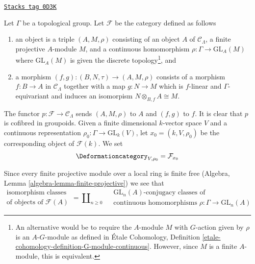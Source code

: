 \begin{example}

\label{examples-defos-example-continuous-representations}
\href{https://stacks.math.columbia.edu/tag/0D3K}{\texttt{Stacks tag 0D3K}}

Let $\Gamma$ be a topological group.
Let $\mathcal{F}$ be the category defined as follows
\begin{enumerate}
\item an object is a triple $(A, M, \rho)$ consisting of an
object $A$ of $\mathcal{C}_\Lambda$, a finite projective $A$-module $M$,
and a continuous homomorphism $\rho : \Gamma \to \text{GL}_A(M)$
where $\text{GL}_A(M)$ is given the discrete topology\footnote{An alternative
would be to require the $A$-module $M$ with $G$-action given by $\rho$
is an $A\text{-}G$-module as defined in \'Etale Cohomology, Definition
\ref{etale-cohomology-definition-G-module-continuous}. However,
since $M$ is a finite $A$-module, this is equivalent.}, and
\item a morphism $(f, g) : (B, N, \tau) \to (A, M, \rho)$ consists of
a morphism $f : B \to A$ in $\mathcal{C}_\Lambda$ together
with a map $g : N \to M$ which is $f$-linear and $\Gamma$-equivariant
and induces an isomorpism $N \otimes_{B, f} A \cong M$.
\end{enumerate}
The functor $p : \mathcal{F} \to \mathcal{C}_\Lambda$ sends $(A, M, \rho)$
to $A$ and $(f, g)$ to $f$. It is clear that $p$ is cofibred in groupoids.
Given a finite dimensional $k$-vector space $V$ and a
continuous representation $\rho_0 : \Gamma \to \text{GL}_k(V)$,
let $x_0 = (k, V, \rho_0)$ be the corresponding object of $\mathcal{F}(k)$.
We set
$$
\Deformationcategory_{V, \rho_0} = \mathcal{F}_{x_0}
$$
\end{example}

Since every finite projective module over a local ring is finite free
(Algebra, Lemma \ref{algebra-lemma-finite-projective})
we see that
$$
\begin{matrix}
\text{isomorphism classes} \\
\text{of objects of }\mathcal{F}(A)
\end{matrix}
=
\coprod\nolimits_{n \geq 0}\quad
\begin{matrix}
\text{GL}_n(A)\text{-conjugacy classes of}\\
\text{continuous homomorphisms }\rho : \Gamma \to \text{GL}_n(A)
\end{matrix}
$$

